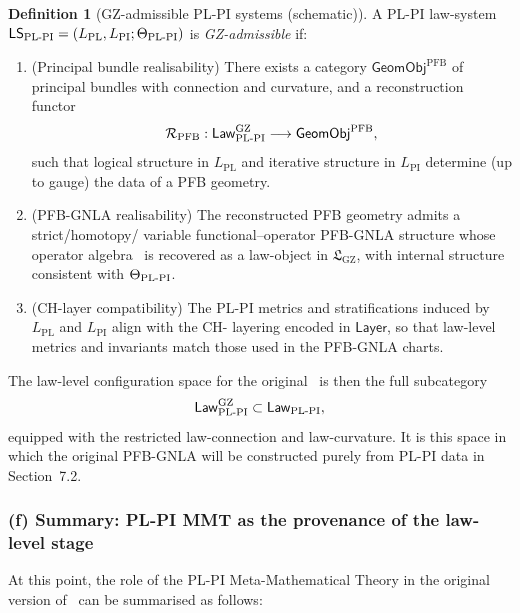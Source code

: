 \documentclass[11pt]{book}
\theoremstyle{plain}
\theoremstyle{definition}
\newtheorem{definition}[theorem]{Definition} \theoremstyle{remark}
\newcommand{\GZLS}{\ensuremath{\mathfrak{L}_{\mathrm{GZ}}}}       \newcommand{\GZLT}{\ensuremath{M_{!w}}}                           \newcommand{\GZLOC}{\ensuremath{A_M}}                             \newcommand{\GZLCurv}{\ensuremath{\mathcal{F}_{\mathrm{law}}}}
\begin{document}
\begin{definition}[GZ-admissible PL-PI systems (schematic)]
A PL-PI law-system
  $\mathsf{LS}_{\mathrm{PL\text- PI}}=
   (L_{\mathrm{PL}},L_{\mathrm{PI}};\Theta_{\mathrm{PL\text- PI}})$
  is \emph{GZ-admissible} if:
  \begin{enumerate}[label=\roman*)]
    \item (Principal bundle realisability)
          There exists a category $\mathsf{GeomObj}^{\mathrm{PFB}}$
          of principal bundles with connection and curvature, and a
          reconstruction functor
          \[
            \mathcal{R}_{\mathrm{PFB}}:
              \mathsf{Law}_{\mathrm{PL\text- PI}}^{\mathrm{GZ}}
              \longrightarrow
              \mathsf{GeomObj}^{\mathrm{PFB}},
          \]
          such that logical structure in $L_{\mathrm{PL}}$ and
          iterative structure in $L_{\mathrm{PI}}$ determine (up to
          gauge) the data of a PFB geometry.
    \item (PFB-GNLA realisability)
          The reconstructed PFB geometry admits a strict/homotopy/
          variable functional–operator PFB-GNLA structure whose
          operator algebra \GAlgebra\ is recovered as a law-object in
          \GZLS, with internal structure consistent with
          $\Theta_{\mathrm{PL\text- PI}}$.
    \item (CH-layer compatibility)
          The PL-PI metrics and stratifications induced by
          $L_{\mathrm{PL}}$ and $L_{\mathrm{PI}}$ align with the CH-
          layering encoded in $\mathsf{Layer}$, so that law-level
          metrics and invariants match those used in the PFB-GNLA
          charts.
  \end{enumerate}
\end{definition}

The law-level configuration space for the original \GAlgebra\ is then
the full subcategory
\[
   \mathsf{Law}_{\mathrm{PL\text- PI}}^{\mathrm{GZ}}
   \subset
   \mathsf{Law}_{\mathrm{PL\text- PI}},
\]
equipped with the restricted law-connection and law-curvature. It is
this space in which the original PFB-GNLA will be constructed purely
from PL-PI data in Section~7.2.



\subsubsection*{(f) Summary: PL-PI MMT as the provenance of the law-level stage}

At this point, the role of the PL-PI Meta-Mathematical Theory in the
original version of \GAlgebra\ can be summarised as follows:
\end{document}
